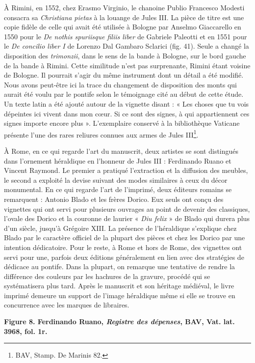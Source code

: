 \documentclass[12pt,twoside,openany]{book}
\begin{document}
À Rimini, en 1552, chez Erasmo Virginio, le chanoine Publio Francesco Modesti consacra sa \textit{Christiana pietas} à la louange de Jules III. La pièce de titre est une copie fidèle de celle qui avait été utilisée à Bologne par Anselmo Giaccarello en 1550 pour le \textit{De nothis spuriisque filiis liber }de Gabriele Paleotti et en 1551 pour le \textit{De concilio liber I }de Lorenzo Dal Gambaro Sclarici (fig. 41). Seule a changé la disposition des \textit{trimonzii}, dans le sens de la bande à Bologne, sur le bord gauche de la bande à Rimini. Cette similitude n’est pas surprenante, Rimini étant voisine de Bologne. Il pourrait s’agir du même instrument dont un détail a été modifié. Nous avons peut-être ici la trace du changement de disposition des monts qui aurait été voulu par le pontife selon le témoignage cité au début de cette étude. Un texte latin a été ajouté autour de la vignette disant : « Les choses que tu vois dépeintes ici vivent dans mon cœur. Si ce sont des signes, à qui appartiennent ces signes importe encore plus ». L’exemplaire conservé à la bibliothèque Vaticane présente l’une des rares reliures connues aux armes de Jules III\footnote{BAV, Stamp. De Marinis 82.}.

À Rome, en ce qui regarde l’art du manuscrit, deux artistes se sont distingués dans l’ornement héraldique en l’honneur de Jules III : Ferdinando Ruano et Vincent Raymond. Le premier a pratiqué l’extraction et la diffusion des meubles, le second a exploité la devise suivant des modes similaires à ceux du décor monumental. En ce qui regarde l’art de l’imprimé, deux éditeurs romains se remarquent : Antonio Blado et les frères Dorico. Eux seuls ont conçu des vignettes qui ont servi pour plusieurs ouvrages au point de devenir des classiques, l’ovale des Dorico et la couronne de laurier « \textit{Diu felix} » de Blado qui durera plus d’un siècle, jusqu’à Grégoire XIII. La présence de l’héraldique s’explique chez Blado par le caractère officiel de la plupart des pièces et chez les Dorico par une intention dédicatoire. Pour le reste, à Rome et hors de Rome, des vignettes ont servi pour une, parfois deux éditions généralement en lien avec des stratégies de dédicace au pontife. Dans la plupart, on remarque une tentative de rendre la différence des couleurs par les hachures de la gravure, procédé qui se systématisera plus tard. Après le manuscrit et son héritage médiéval, le livre imprimé demeure un support de l’image héraldique même si elle se trouve en concurrence avec les marques de libraires.

\begin{center}
\par\small \textbf{Figure 8. Ferdinando Ruano, \textit{Registre des dépenses}, BAV, Vat. lat. 3968, fol. 1r.}
\end{center}
\end{document}
